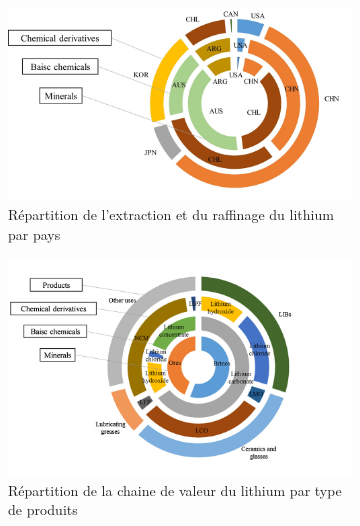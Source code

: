 \begin{figure}[!b]
\centering
\begin{subfigure}{0.4\textwidth}
    \includegraphics[width=\textwidth]{Images/supply_chain/1-s2.0-S0921344917301118-gr5_lrg.jpg}
    \caption{Répartition de l'extraction et du raffinage du lithium par pays}
    \label{fig:lithium_country}
\end{subfigure}
\hfill
\begin{subfigure}{0.4\textwidth}
    \includegraphics[width=\textwidth]{Images/supply_chain/1-s2.0-S0921344917301118-gr6_lrg.jpg}
    \caption{Répartition de la chaine de valeur du lithium par type de produits}
    \label{fig:lithium_type}
\end{subfigure}
\hfill
\begin{subfigure}{0.4\textwidth}

\end{subfigure}
\end{figure}
